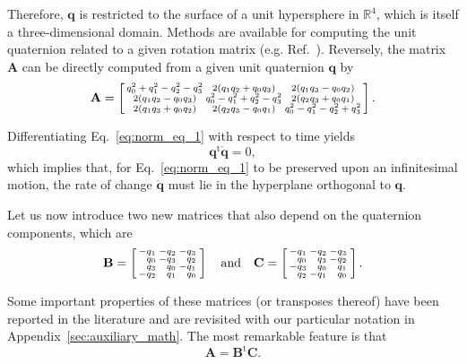 \documentclass[aip,jcp,reprint,amsmath,amssymb]{revtex4-1}
\makeatletter
\newcommand{\mt}[1]{\boldsymbol{\mathbf{#1}}}           %
\newcommand{\vt}[1]{\boldsymbol{\mathbf{#1}}}           %
\newcommand{\tr}[1]{#1^\text{t}}                        %
\newenvironment{smallarray}[1]                          %
{\null\,\vcenter\bgroup\scriptsize
	\renewcommand{\arraystretch}{0.7}
	\arraycolsep=.13885em
	\hbox\bgroup$\array{@{}#1@{}}}
{\endarray$\egroup\egroup\,\null}
\makeatother
\begin{document}
Therefore, $\vt q$ is restricted to the surface of a unit hypersphere in $\mathbb{R}^4$, which is itself a three-dimensional domain. Methods are available for computing the unit quaternion related to a given rotation matrix (e.g. Ref.~). Reversely, the matrix $\mt A$ can be directly computed from a given unit quaternion $\vt q$ by\cite{Allen1989,Miller2002}
\[
\label{eq:A_from_q}
\mt A = \left[ \begin{smallarray}{ccc}
q_0^2 + q_1^2 - q_2^2 - q_3^2 & 2(q_1 q_2 + q_0 q_3) & 2(q_1 q_3 - q_0 q_2) \\
2(q_1 q_2 - q_0 q_3) & q_0^2 - q_1^2 + q_2^2 - q_3^2 & 2(q_2 q_3 + q_0 q_1) \\
2(q_1 q_3 + q_0 q_2) & 2(q_2 q_3 - q_0 q_1) & q_0^2 - q_1^2 - q_2^2 + q_3^2  
\end{smallarray} \right].
\]

Differentiating Eq.~\ref{eq:norm_eq_1} with respect to time yields
\begin{equation}
\label{eq:diff_qTq}
\tr{\vt q}\dot{\vt q} = 0,
\end{equation}
which implies that, for Eq.~\ref{eq:norm_eq_1} to be preserved upon an infinitesimal motion, the rate of change $\dot{\vt q}$ must lie in the hyperplane orthogonal to $\vt q$.

Let us now introduce two new matrices that also depend on the quaternion components, which are
\begin{equation}
\label{eq:def_B_and_C}
\mt B = \left[
\begin{smallarray}{rrrr}
-q_1 & -q_2 & -q_3 \\
 q_0 & -q_3 &  q_2 \\
 q_3 &  q_0 & -q_1 \\
-q_2 &  q_1 &  q_0
\end{smallarray}
\right]
\quad \text{and} \quad
\mt C = \left[
\begin{smallarray}{rrrr}
-q_1 & -q_2 & -q_3 \\
 q_0 &  q_3 & -q_2 \\
-q_3 &  q_0 &  q_1 \\
 q_2 & -q_1 &  q_0
\end{smallarray}
\right].
\end{equation}

Some important properties of these matrices (or transposes thereof) have been reported in the literature\cite{Haug1989, Shuster1993, Dichmann1999, Ravishankar2004, Nielsen2012} and are revisited with our particular notation in Appendix~\ref{sec:auxiliary_math}. The most remarkable feature is that
\begin{equation}
\label{eq:factorization_of_A}
{\mt A} = \tr{\mt B}{\mt C}.
\end{equation}
\end{document}
